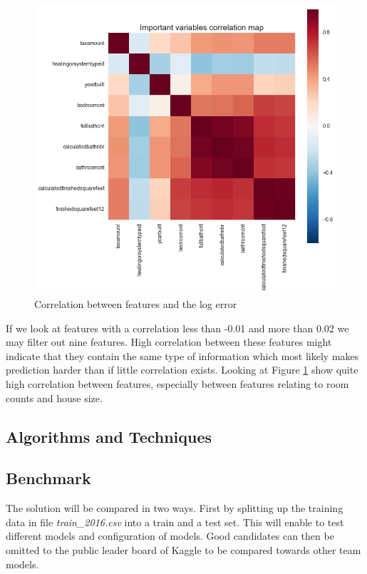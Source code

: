 \documentclass[a4paper]{article}
\begin{document}
\begin{figure}
\centering
\includegraphics[width=1\textwidth]{./img/prop-corr-feature.png}
\caption{\label{fig:prop-corr-feature} Correlation between features and the log error}
\end{figure}
If we look at features with a correlation less than -0.01 and more than 0.02 we may filter out nine features. High
correlation between these features might indicate that they contain the same type of information which most
likely makes prediction harder than if little correlation exists. Looking at Figure \ref{fig:prop-corr-feature}
show quite high correlation between features, especially between features relating to room counts and house size.


\subsection{Algorithms and Techniques}


\subsection{Benchmark}
The solution will be compared in two ways. First by splitting up the training data in file \textit{train\_2016.csv}
into a train and a test set. This will enable to test different models and configuration of models. Good candidates
can then be omitted to the public leader board of Kaggle to be compared towards other team models.
\end{document}
